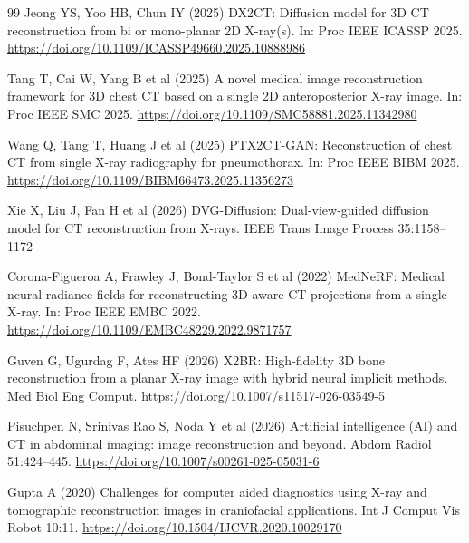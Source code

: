 \documentclass[10pt,twocolumn,a4paper]{article}
\begin{document}
\begin{thebibliography}{99}
Jeong YS, Yoo HB, Chun IY (2025) DX2CT: Diffusion model for 3D CT
reconstruction from bi or mono-planar 2D X-ray(s). In: Proc IEEE ICASSP 2025.
\url{https://doi.org/10.1109/ICASSP49660.2025.10888986}

Tang T, Cai W, Yang B et al (2025) A novel medical image reconstruction
framework for 3D chest CT based on a single 2D anteroposterior X-ray image.
In: Proc IEEE SMC 2025.
\url{https://doi.org/10.1109/SMC58881.2025.11342980}

Wang Q, Tang T, Huang J et al (2025) PTX2CT-GAN: Reconstruction of chest CT
from single X-ray radiography for pneumothorax. In: Proc IEEE BIBM 2025.
\url{https://doi.org/10.1109/BIBM66473.2025.11356273}

Xie X, Liu J, Fan H et al (2026) DVG-Diffusion: Dual-view-guided diffusion
model for CT reconstruction from X-rays. IEEE Trans Image Process 35:1158--1172

Corona-Figueroa A, Frawley J, Bond-Taylor S et al (2022) MedNeRF: Medical
neural radiance fields for reconstructing 3D-aware CT-projections from a single
X-ray. In: Proc IEEE EMBC 2022.
\url{https://doi.org/10.1109/EMBC48229.2022.9871757}

Guven G, Ugurdag F, Ates HF (2026) X2BR: High-fidelity 3D bone reconstruction
from a planar X-ray image with hybrid neural implicit methods. Med Biol Eng
Comput. \url{https://doi.org/10.1007/s11517-026-03549-5}

Pisuchpen N, Srinivas Rao S, Noda Y et al (2026) Artificial intelligence (AI)
and CT in abdominal imaging: image reconstruction and beyond. Abdom Radiol
51:424--445. \url{https://doi.org/10.1007/s00261-025-05031-6}

Gupta A (2020) Challenges for computer aided diagnostics using X-ray and
tomographic reconstruction images in craniofacial applications. Int J Comput
Vis Robot 10:11. \url{https://doi.org/10.1504/IJCVR.2020.10029170}

\end{thebibliography}
\end{document}
